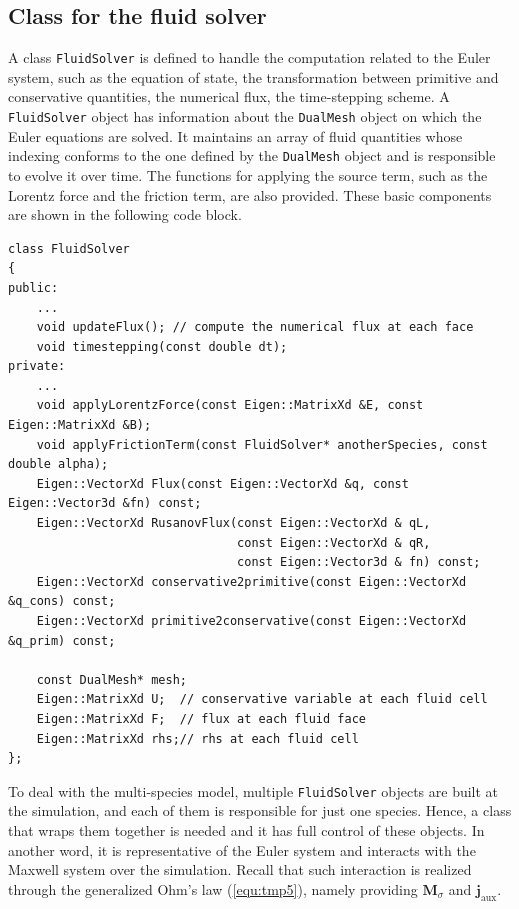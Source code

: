 \documentclass{report}
\begin{document}
\begin{appendices}
\section{Class for the fluid solver}
A class \texttt{FluidSolver} is defined to handle the computation related to the Euler system, such as the equation of state, the transformation between primitive and conservative quantities, the numerical flux, the time-stepping scheme. A \texttt{FluidSolver} object has information about the \texttt{DualMesh} object on which the Euler equations are solved. It maintains an array of fluid quantities whose indexing conforms to the one defined by the \texttt{DualMesh} object and is responsible to evolve it over time. The functions for applying the source term, such as the Lorentz force and the friction term, are also provided. These basic components are shown in the following code block.
\begin{lstlisting}[numbers=none]
class FluidSolver
{
public:
    ...
    void updateFlux(); // compute the numerical flux at each face
    void timestepping(const double dt);
private:
    ...
    void applyLorentzForce(const Eigen::MatrixXd &E, const Eigen::MatrixXd &B);
    void applyFrictionTerm(const FluidSolver* anotherSpecies, const double alpha);
    Eigen::VectorXd Flux(const Eigen::VectorXd &q, const Eigen::Vector3d &fn) const;
    Eigen::VectorXd RusanovFlux(const Eigen::VectorXd & qL, 
                                const Eigen::VectorXd & qR,
                                const Eigen::Vector3d & fn) const;
    Eigen::VectorXd conservative2primitive(const Eigen::VectorXd &q_cons) const;
    Eigen::VectorXd primitive2conservative(const Eigen::VectorXd &q_prim) const;
    
    const DualMesh* mesh;
    Eigen::MatrixXd U;  // conservative variable at each fluid cell
    Eigen::MatrixXd F;  // flux at each fluid face
    Eigen::MatrixXd rhs;// rhs at each fluid cell
};
\end{lstlisting}

To deal with the multi-species model, multiple \texttt{FluidSolver} objects are built at the simulation, and each of them is responsible for just one species. Hence, a class that wraps them together is needed and it has full control of these objects. In another word, it is representative of the Euler system and interacts with the Maxwell system over the simulation. Recall that such interaction is realized through the generalized Ohm's law (\ref{equ:tmp5}), namely providing $\mathbf{M}_\sigma$ and $\mathbf{j}_{\text{aux}}$.


\end{appendices}
\end{document}
